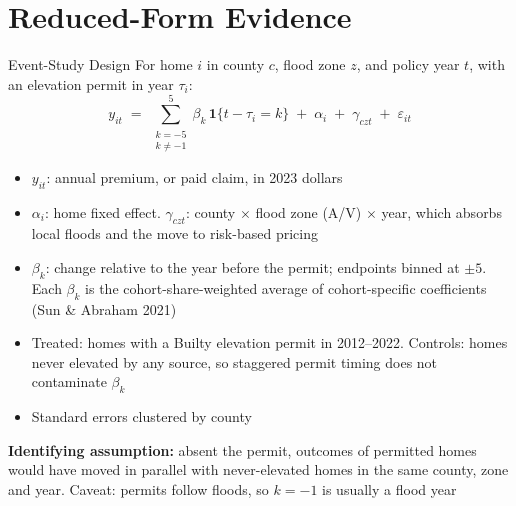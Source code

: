 \documentclass[serif, aspectratio=169, 10pt]{beamer}
\begin{document}
\section{Reduced-Form Evidence}

\begin{frame}{Event-Study Design}
\small
For home $i$ in county $c$, flood zone $z$, and policy year $t$, with an elevation permit in year $\tau_i$:
\begin{equation*}
    y_{it} \;=\; \sum_{\substack{k=-5 \\ k \neq -1}}^{5} \beta_k \,\mathbf{1}\{t - \tau_i = k\}
    \;+\; \alpha_i \;+\; \gamma_{czt} \;+\; \varepsilon_{it}
\end{equation*}
\begin{itemize}
    \item $y_{it}$: annual premium, or paid claim, in 2023 dollars
    \item $\alpha_i$: home fixed effect. $\gamma_{czt}$: county $\times$ flood zone (A/V) $\times$ year, which absorbs local floods and the move to risk-based pricing
    \item $\beta_k$: change relative to the year before the permit; endpoints binned at $\pm 5$. Each $\beta_k$ is the cohort-share-weighted average of cohort-specific coefficients (Sun \& Abraham 2021)
    \item Treated: homes with a Builty elevation permit in 2012--2022. Controls: homes never elevated by any source, so staggered permit timing does not contaminate $\beta_k$
    \item Standard errors clustered by county
\end{itemize}
\textbf{Identifying assumption:} absent the permit, outcomes of permitted homes would have moved in parallel with never-elevated homes in the same county, zone and year. Caveat: permits follow floods, so $k=-1$ is usually a flood year
\end{frame}
\end{document}
